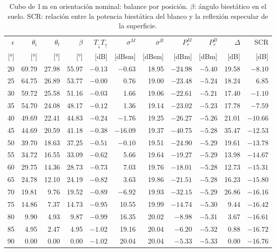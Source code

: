 \documentclass[11pt,a4paper]{report}
\begin{document}
\begin{table}[H]
\centering
\caption{Cubo de 1\,m en orientación nominal: balance por posición.
$\beta$: ángulo biestático en el suelo. SCR: relación entre la potencia
biestática del blanco y la reflexión especular de la superficie.}
\label{tab:cubo_nominal}
\small
\begin{tabular}{@{}rrrrrrrrrrr@{}}
\toprule
$\epsilon$ & $\theta_i$ & $\theta_t$ & $\beta$ & $T_\downarrow T_\uparrow$ & $\sigma^M$ & $\sigma^B$ & $P_r^M$ & $P_r^B$ & $\Delta$ & SCR \\
{[°]} & {[°]} & {[°]} & {[°]} & [dB] & [dBsm] & [dBsm] & [dBm] & [dBm] & [dB] & [dB] \\
\midrule
20 & 69.79 & 27.98 & 55.97 & $-0.13$ & $-0.63$ & 18.95 & $-24.98$ & $-5.40$ & 19.58 & $-8.10$ \\
25 & 64.75 & 26.89 & 53.77 & $-0.00$ & 0.76 & 19.00 & $-23.48$ & $-5.24$ & 18.24 & 6.85 \\
30 & 59.72 & 25.58 & 51.16 & $-0.03$ & 1.66 & 19.06 & $-22.61$ & $-5.21$ & 17.40 & $-1.10$ \\
35 & 54.70 & 24.08 & 48.17 & $-0.12$ & 1.36 & 19.14 & $-23.02$ & $-5.23$ & 17.78 & $-7.59$ \\
40 & 49.69 & 22.41 & 44.83 & $-0.24$ & $-1.76$ & 19.25 & $-26.27$ & $-5.26$ & 21.01 & $-10.66$ \\
45 & 44.69 & 20.59 & 41.18 & $-0.38$ & $-16.09$ & 19.37 & $-40.75$ & $-5.28$ & 35.47 & $-12.53$ \\
50 & 39.70 & 18.63 & 37.25 & $-0.51$ & $-0.10$ & 19.51 & $-24.90$ & $-5.29$ & 19.61 & $-13.78$ \\
55 & 34.72 & 16.55 & 33.09 & $-0.62$ & 5.66 & 19.64 & $-19.27$ & $-5.29$ & 13.98 & $-14.67$ \\
60 & 29.75 & 14.36 & 28.73 & $-0.73$ & 7.03 & 19.76 & $-18.01$ & $-5.28$ & 12.73 & $-15.31$ \\
65 & 24.78 & 12.10 & 24.19 & $-0.82$ & 3.63 & 19.86 & $-21.51$ & $-5.28$ & 16.23 & $-15.80$ \\
70 & 19.81 & 9.76 & 19.52 & $-0.89$ & $-6.92$ & 19.93 & $-32.15$ & $-5.29$ & 26.86 & $-16.16$ \\
75 & 14.86 & 7.37 & 14.73 & $-0.95$ & 10.55 & 19.99 & $-14.74$ & $-5.30$ & 9.44 & $-16.42$ \\
80 & 9.90 & 4.93 & 9.87 & $-0.99$ & 16.35 & 20.02 & $-8.98$ & $-5.31$ & 3.67 & $-16.61$ \\
85 & 4.95 & 2.47 & 4.95 & $-1.02$ & 19.16 & 20.04 & $-6.20$ & $-5.32$ & 0.88 & $-16.72$ \\
90 & 0.00 & 0.00 & 0.00 & $-1.02$ & 20.04 & 20.04 & $-5.33$ & $-5.33$ & 0.00 & $-16.76$ \\
\bottomrule
\end{tabular}
\end{table}
\end{document}
